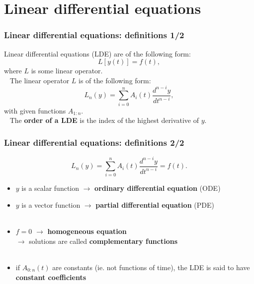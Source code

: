 \zbea
{}

\newif\ifpdf
\ifx\pdfoutput\undefined
\pdffalse
\else
{}
\pdftrue
\fi
\ifpdf

\else

\fi



\begin{frame}
\tableofcontents
\end{frame}

\section{Linear differential equations}

\begin{frame}
\frametitle{Linear differential equations: definitions 1/2}
Linear differential equations (LDE) are of the following form:
\begin{equation*}
L[y(t)] = f(t),
\end{equation*}
where $L$ is some linear operator. \\ \pause
\ \newline
The linear operator $L$ is of the following form:
\begin{equation*}
L_n(y) = \sum_{i=0}^{n} A_i(t) \frac{d^{n-i}y}{dt^{n-i}},
\end{equation*}
with given functions $A_{1:n}$.\\ \pause
\ \newline
The \textbf{order of a LDE} is the index of the highest derivative of $y$.
\end{frame}

\begin{frame}
\frametitle{Linear differential equations: definitions 2/2}
\begin{equation*}
L_n(y) = \sum_{i=0}^{n} A_i(t) \frac{d^{n-i}y}{dt^{n-i}} = f(t).
\end{equation*}
\begin{itemize}
\item $y$ is a scalar function $\rightarrow$ \textbf{ordinary differential equation} (ODE) \pause
\item $y$ is a vector function $\rightarrow$ \textbf{partial differential equation} (PDE) \\
\ \pause
\item $f = 0$ $\rightarrow$ \textbf{homogeneous equation} \\
$\rightarrow$ solutions are called \textbf{complementary functions} \\
\ \pause
\item if $A_{0:n}(t)$ are constants (ie. not functions of time), the LDE is said to have \textbf{constant coefficients}
\end{itemize}
\end{frame}


